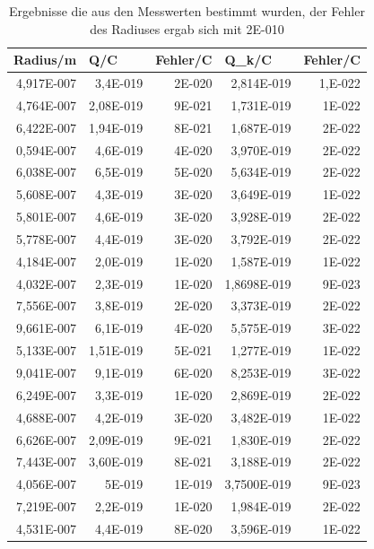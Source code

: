\documentclass[12pt]{scrartcl}
\begin{document}
\begin{table}[H]
\caption{Ergebnisse die aus den Messwerten bestimmt wurden, der Fehler des Radiuses ergab sich mit 2E-010}
\begin{center}
\begin{tabular}{|r|r|r|r|r|}
\hline
\multicolumn{1}{|l|}{Radius/m} & \multicolumn{1}{l|}{Q/C} & \multicolumn{1}{l|}{Fehler/C} & \multicolumn{1}{l|}{Q\_k/C} & \multicolumn{1}{l|}{Fehler/C} \\ \hline
4,917E-007 & 3,4E-019 & 2E-020 & 2,814E-019 & 1,E-022 \\ \hline
4,764E-007 & 2,08E-019 & 9E-021 & 1,731E-019 & 1E-022 \\ \hline
6,422E-007 & 1,94E-019 & 8E-021 & 1,687E-019 & 2E-022 \\ \hline
0,594E-007 & 4,6E-019 & 4E-020 & 3,970E-019 & 2E-022 \\ \hline
6,038E-007 & 6,5E-019 & 5E-020 & 5,634E-019 & 2E-022 \\ \hline
5,608E-007 & 4,3E-019 & 3E-020 & 3,649E-019 & 1E-022 \\ \hline
5,801E-007 & 4,6E-019 & 3E-020 & 3,928E-019 & 2E-022 \\ \hline
5,778E-007 & 4,4E-019 & 3E-020 & 3,792E-019 & 2E-022 \\ \hline
4,184E-007 & 2,0E-019 & 1E-020 & 1,587E-019 & 1E-022 \\ \hline
4,032E-007 & 2,3E-019 & 1E-020 & 1,8698E-019 & 9E-023 \\ \hline
7,556E-007 & 3,8E-019 & 2E-020 & 3,373E-019 & 2E-022 \\ \hline
9,661E-007 & 6,1E-019 & 4E-020 & 5,575E-019 & 3E-022 \\ \hline
5,133E-007 & 1,51E-019 & 5E-021 & 1,277E-019 & 1E-022 \\ \hline
9,041E-007 & 9,1E-019 & 6E-020 & 8,253E-019 & 3E-022 \\ \hline
6,249E-007 & 3,3E-019 & 1E-020 & 2,869E-019 & 2E-022 \\ \hline
4,688E-007 & 4,2E-019 & 3E-020 & 3,482E-019 & 1E-022 \\ \hline
6,626E-007 & 2,09E-019 & 9E-021 & 1,830E-019 & 2E-022 \\ \hline
7,443E-007 & 3,60E-019 & 8E-021 & 3,188E-019 & 2E-022 \\ \hline
4,056E-007 & 5E-019 & 1E-019 & 3,7500E-019 & 9E-023 \\ \hline
7,219E-007 & 2,2E-019 & 1E-020 & 1,984E-019 & 2E-022 \\ \hline
4,531E-007 & 4,4E-019 & 8E-020 & 3,596E-019 & 1E-022 \\ \hline

\end{tabular}
\end{center}
\end{table}
\end{document}
